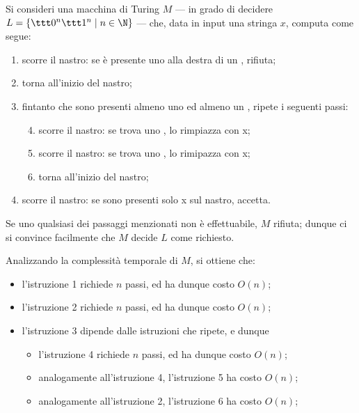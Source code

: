 \documentclass[a4paper, 12pt]{report}
\begin{document}
    \begin{example}
        Si consideri una macchina di Turing $M$ --- in grado di decidere $L= \{\ttt 0 ^n \ttt 1 ^n \mid n \in \N\}$ --- che, data in input una stringa $x$, computa come segue: 

        \begin{enumerate}
            \item scorre il nastro: se è presente uno  alla destra di un , rifiuta;
            \item torna all'inizio del nastro;
            \item fintanto che sono presenti almeno uno  ed almeno un , ripete i seguenti passi:
                \begin{enumerate}[label=\arabic*.]
                    \setcounter{enumii}{3}
                    \setcounter{enumi}{6}
                    \item scorre il nastro: se trova uno , lo rimpiazza con \ttt x;
                    \item scorre il nastro: se trova uno , lo rimipazza con \ttt x;
                    \item torna all'inizio del nastro;
                \end{enumerate}
            \item scorre il nastro: se sono presenti solo \ttt x sul nastro, accetta.
        \end{enumerate}

        Se uno qualsiasi dei passaggi menzionati non è effettuabile, $M$ rifiuta; dunque ci si convince facilmente che $M$ decide $L$ come richiesto.

        Analizzando la complessità temporale di $M$, si ottiene che:

        \begin{itemize}
            \item l'istruzione 1 richiede $n$ passi, ed ha dunque costo $O(n)$;
            \item l'istruzione 2 richiede $n$ passi, ed ha dunque costo $O(n)$;
            \item l'istruzione 3 dipende dalle istruzioni che ripete, e dunque

                \begin{itemize}
                    \item l'istruzione 4 richiede $n$ passi, ed ha dunque costo $O(n)$;
                    \item analogamente all'istruzione 4, l'istruzione 5 ha costo $O(n)$;
                    \item analogamente all'istruzione 2, l'istruzione 6 ha costo $O(n)$;
                \end{itemize}


\end{itemize}
\end{example}
\end{document}
